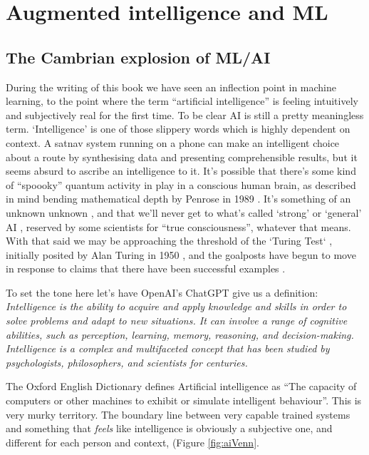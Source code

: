 \section{Augmented intelligence and ML}
\subsection{The Cambrian explosion of ML/AI}
During the writing of this book we have seen an inflection point in machine learning, to the point where the term ``artificial intelligence'' is feeling intuitively and subjectively real for the first time.  To be clear AI is still a pretty meaningless term. `Intelligence' is one of those slippery words which is highly dependent on context. A satnav system running on a phone can make an intelligent choice about a route by synthesising data and presenting comprehensible results, but it seems absurd to ascribe an intelligence to it. It's possible that there's some kind of ``spoooky'' quantum activity in play in a conscious human brain, as described in mind bending mathematical depth by Penrose in 1989 \cite{penrose1990emperor}. It's something of an unknown unknown \cite{kerskens2022experimental}, and that we'll never get to what's called `strong' or `general' AI \cite{larson2021myth, searle1980minds}, reserved by some scientists for ``true consciousness'', whatever that means. With that said we may be approaching the threshold of the `Turing Test` \cite{sep-turing-test}, initially posited by Alan Turing in 1950 \cite{turing1950computing}, and the goalposts have begun to move in response to claims that there have been successful examples \cite{warwick2016can, french2012moving, french2000turing, searle2009turing}.\par
To set the tone here let's have OpenAI's ChatGPT give us a definition:
\textit{Intelligence is the ability to acquire and apply knowledge and skills in order to solve problems and adapt to new situations. It can involve a range of cognitive abilities, such as perception, learning, memory, reasoning, and decision-making. Intelligence is a complex and multifaceted concept that has been studied by psychologists, philosophers, and scientists for centuries.}\par
The Oxford English Dictionary defines Artificial intelligence as ``The capacity of computers or other machines to exhibit or simulate intelligent behaviour''. This is very murky territory. The boundary line between very capable trained systems and something that \textit{feels} like intelligence is obviously a subjective one, and different for each person and context, (Figure \ref{fig:aiVenn}.\par

